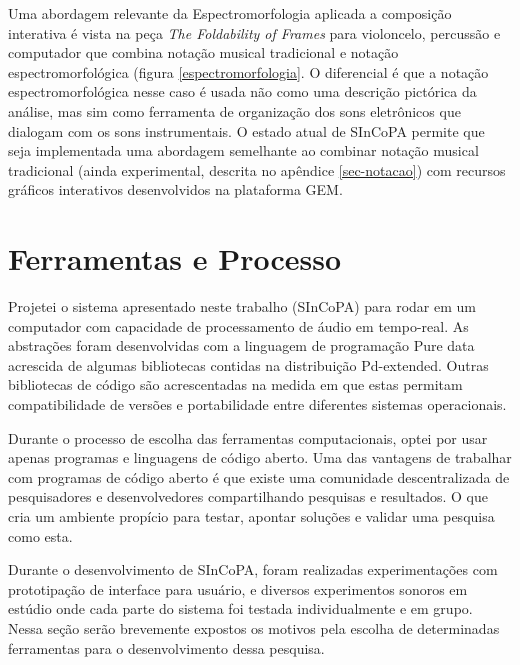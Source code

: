 \documentclass{ppgmus}
\begin{document}
Uma abordagem relevante da Espectromorfologia aplicada a composição interativa é vista na peça
\textit{The Foldability of Frames} \cite{Patton:2007} para violoncelo, percussão e 
computador que combina notação musical tradicional e notação espectromorfológica
(figura \ref{espectromorfologia}.
O diferencial é que a notação espectromorfológica nesse caso é usada não como uma descrição pictórica
da análise, mas sim como ferramenta de organização dos sons eletrônicos que dialogam
com os sons instrumentais. O estado atual de SInCoPA permite que seja implementada uma
abordagem semelhante ao combinar notação musical tradicional (ainda experimental,
descrita no apêndice \ref{sec-notacao}) com recursos gráficos interativos desenvolvidos 
na plataforma GEM.



\chapter{Ferramentas e Processo}
\label{sec:metodologia}



Projetei o sistema apresentado neste trabalho (SInCoPA) para rodar em um computador com capacidade de processamento
de áudio em tempo-real. As abstrações foram desenvolvidas com
a linguagem de programação Pure data acrescida de algumas bibliotecas contidas
na distribuição Pd-extended. Outras bibliotecas de código são
acrescentadas na medida em que estas permitam compatibilidade de
versões e portabilidade entre diferentes sistemas operacionais.

Durante o processo de escolha das ferramentas computacionais, optei
por usar apenas programas e linguagens de código aberto.
Uma das vantagens de trabalhar com programas de código aberto é que existe uma
comunidade descentralizada de pesquisadores e desenvolvedores compartilhando
pesquisas e resultados. O que cria um ambiente propício para testar, apontar soluções e validar 
uma pesquisa como esta.

Durante o desenvolvimento de SInCoPA, foram realizadas experimentações com prototipação de interface para usuário,
e diversos experimentos sonoros em estúdio onde cada parte do sistema foi
testada individualmente e em grupo.
Nessa seção serão brevemente expostos os motivos pela escolha de determinadas ferramentas para
o desenvolvimento dessa pesquisa.
\end{document}
